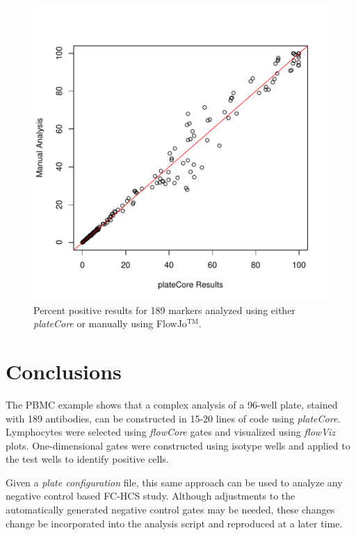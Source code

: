 \documentclass[12pt]{article}
\newcommand{\Rpackage}[1]{{\textit{#1}}}
\begin{document}
\begin{figure}
\centering
\includegraphics{outline-pcVSman}
\caption{Percent positive results for 189 markers analyzed using either \Rpackage{plateCore} or manually using FlowJo$^{\text{TM}}$.}
\label{fig:pcVSman}
\end{figure}

\clearpage
\section{Conclusions}

The PBMC example shows that a complex analysis of a 96-well plate, stained with 189 antibodies,
can be constructed in 15-20 lines of code using \Rpackage{plateCore}. Lymphocytes were selected
using \Rpackage{flowCore} gates and visualized using \Rpackage{flowViz} plots. One-dimensional 
gates were constructed using isotype wells and applied to the test wells to identify positive cells.

Given a \textit{plate configuration} file, this same approach can be used to analyze any
negative control based FC-HCS study. Although adjustments to the automatically generated negative control gates may be needed,
these changes change be incorporated into the analysis script and reproduced at a later time.
\end{document}
